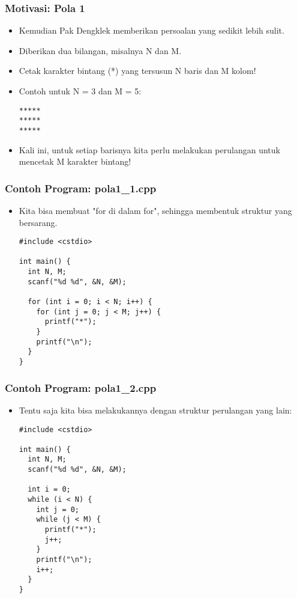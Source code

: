 \begin{frame}[fragile]
\frametitle{Motivasi: Pola 1}
\begin{itemize}
  \item Kemudian Pak Dengklek memberikan persoalan yang sedikit lebih sulit.
  \item Diberikan dua bilangan, misalnya N dan M.
  \item Cetak karakter bintang (*) yang tersusun N baris dan M kolom!

  \item Contoh untuk N = 3 dan M = 5:
\begin{lstlisting}
*****
*****
*****
\end{lstlisting}

  \item Kali ini, untuk setiap barisnya kita perlu melakukan perulangan untuk mencetak M karakter bintang!
\end{itemize}
\end{frame}

\begin{frame}[fragile]
\frametitle{Contoh Program: pola1\_1.cpp}
\begin{itemize}
  \item Kita bisa membuat "for di dalam for", sehingga membentuk struktur yang bersarang.
\begin{lstlisting}
#include <cstdio>

int main() {
  int N, M;
  scanf("%d %d", &N, &M);

  for (int i = 0; i < N; i++) {
    for (int j = 0; j < M; j++) {
      printf("*");
    }
    printf("\n");
  }
}
\end{lstlisting}
\end{itemize}
\end{frame}

\begin{frame}[fragile]
\frametitle{Contoh Program: pola1\_2.cpp}
\begin{itemize}
  \item Tentu saja kita bisa melakukannya dengan struktur perulangan yang lain:
\begin{lstlisting}
#include <cstdio>

int main() {
  int N, M;
  scanf("%d %d", &N, &M);

  int i = 0;
  while (i < N) {
    int j = 0;
    while (j < M) {
      printf("*");
      j++;
    }
    printf("\n");
    i++;
  }
}
\end{lstlisting}
\end{itemize}
\end{frame}

